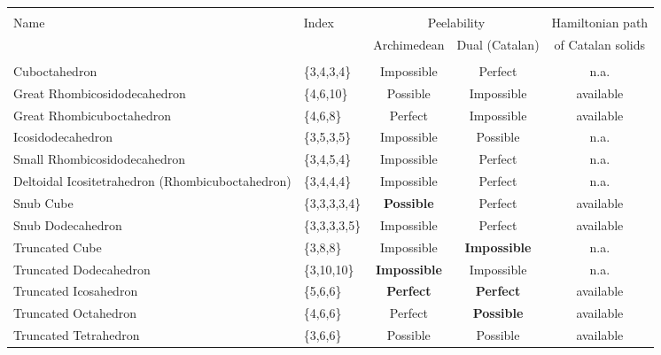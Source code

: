 \documentclass[]{interact}
\theoremstyle{plain}%
\theoremstyle{definition}
\theoremstyle{remark}
\begin{document}
\begin{table}
{
\begin{tabular}{llccc} \toprule \\
Name & Index & \multicolumn{2}{c}{Peelability }& Hamiltonian path \\
 & & Archimedean & Dual (Catalan)&  of Catalan solids\\
 \midrule \\
Cuboctahedron & \{3,4,3,4\} & Impossible & Perfect &  n.a.\\ %
Great Rhombicosidodecahedron & \{4,6,10\} & Possible & Impossible & available \\ %
Great Rhombicuboctahedron & \{4,6,8\} & Perfect & Impossible & available \\ %
Icosidodecahedron & \{3,5,3,5\} & Impossible & Possible & n.a. \\ %
Small Rhombicosidodecahedron & \{3,4,5,4\} & Impossible & Perfect & n.a. \\ %
Deltoidal Icositetrahedron (Rhombicuboctahedron) & \{3,4,4,4\} & Impossible& Perfect & n.a. \\ %
Snub Cube & \{3,3,3,3,4\} & \textbf{Possible} & Perfect & available \\  %
Snub Dodecahedron & \{3,3,3,3,5\} & Impossible & Perfect &  available \\ %
Truncated Cube & \{3,8,8\} & Impossible & \textbf{Impossible} &  n.a.\\ %
Truncated Dodecahedron & \{3,10,10\} & \textbf{Impossible} & Impossible & n.a. \\  %
Truncated Icosahedron & \{5,6,6\} & \textbf{Perfect} & \textbf{Perfect} & available \\  %
Truncated Octahedron & \{4,6,6\} & Perfect & \textbf{Possible} & available \\  %
Truncated Tetrahedron & \{3,6,6\} & Possible & Possible &  available \\ %
\end{tabular}
}\end{table}
\end{document}
